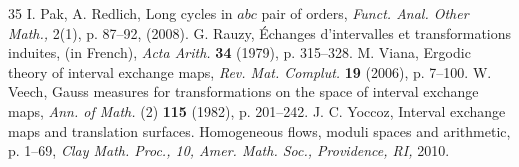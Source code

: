 \documentclass[12pt,a4paper]{amsart}
\begin{document}
\begin{thebibliography}{35}
 I. Pak, A. Redlich, Long cycles in $abc$ pair of orders, {\it Funct. Anal. Other Math.,} 2(1), p. 87--92, (2008). 
   G. Rauzy,  \'Echanges d'intervalles et
transformations induites, (in French), {\it Acta Arith.} {\bf 34} (1979),
p. 315--328.
 M. Viana,  Ergodic theory of interval exchange maps, {\it Rev. Mat. Complut.} {\bf 19} (2006), p. 7--100.
 W. Veech,  Gauss measures for transformations on the space of interval exchange maps, {\it Ann. of Math.} (2) {\bf 115} (1982), p. 201--242.
 J. C. Yoccoz,  Interval exchange maps and translation surfaces. Homogeneous flows, moduli spaces and arithmetic, p. 1--69, {\it Clay Math. Proc., 10, Amer. Math. Soc., Providence, RI,} 2010.
\end{thebibliography}
\end{document}
